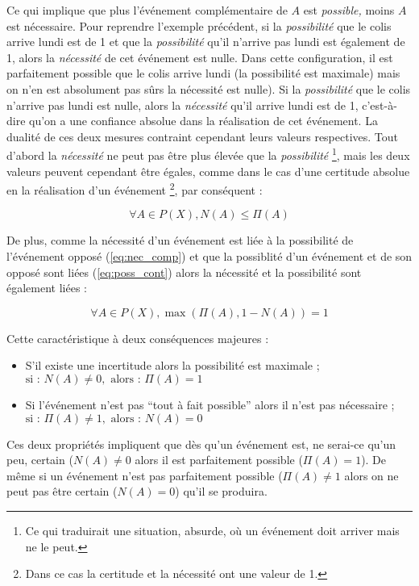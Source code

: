 Ce qui implique que plus l'événement complémentaire de \(A\) est
\emph{possible,} moins \(A\) est nécessaire. Pour reprendre l'exemple
précédent, si la \emph{possibilité} que le colis arrive lundi est de 1
et que la \emph{possibilité} qu'il n'arrive pas lundi est également de
1, alors la \emph{nécessité} de cet événement est nulle. Dans cette
configuration, il est parfaitement possible que le colis arrive lundi
(la possibilité est maximale) mais on n'en est absolument pas sûrs la
nécessité est nulle). Si la \emph{possibilité} que le colis n'arrive
pas lundi est nulle, alors la \emph{nécessité} qu'il arrive lundi est
de 1, c'est-à-dire qu'on a une confiance absolue dans la réalisation
de cet événement. La dualité de ces deux mesures contraint cependant
leurs valeurs respectives. Tout d'abord la \emph{nécessité} ne peut
pas être plus élevée que la \emph{possibilité} \footnote{Ce qui
  traduirait une situation, absurde, où un événement doit arriver mais
  ne le peut.}, mais les deux valeurs peuvent cependant être égales,
comme dans le cas d'une certitude absolue en la réalisation d'un
événement \footnote{Dans ce cas la certitude et la nécessité ont une
  valeur de 1.}, par conséquent :

\begin{equation}
  \forall A \in P(X), N(A) ≤ \Pi(A)
\end{equation}

De plus, comme la nécessité d'un événement est liée à la possibilité
de l'événement opposé (\autoref{eq:nec_comp}) et que la possiblité
d'un événement et de son opposé sont liées (\autoref{eq:poss_cont})
alors la nécessité et la possibilité sont également liées :

\begin{equation}
  \forall A \in P(X), \max(\Pi(A), 1-N(A)) = 1
\end{equation}

Cette caractéristique à deux conséquences majeures :

\begin{itemize}
\item S'il existe une incertitude alors la possibilité est maximale ;
  \(\text{si : } N(A) ≠ 0, \text{ alors : } Π(A)=1\)
\item Si l'événement n'est pas \enquote{tout à fait possible} alors il
  n'est pas nécessaire ;
  \(\text{si : } Π(A) ≠ 1, \text{ alors : } N(A)=0\)
\end{itemize}

Ces deux propriétés impliquent que dès qu'un événement est, ne
serai-ce qu'un peu, certain (\(N(A) ≠ 0\) alors il est parfaitement
possible (\(Π(A)=1\)). De même si un événement n'est pas parfaitement
possible (\(Π(A) ≠ 1\) alors on ne peut pas être certain
(\(N(A) = 0\)) qu'il se produira.

